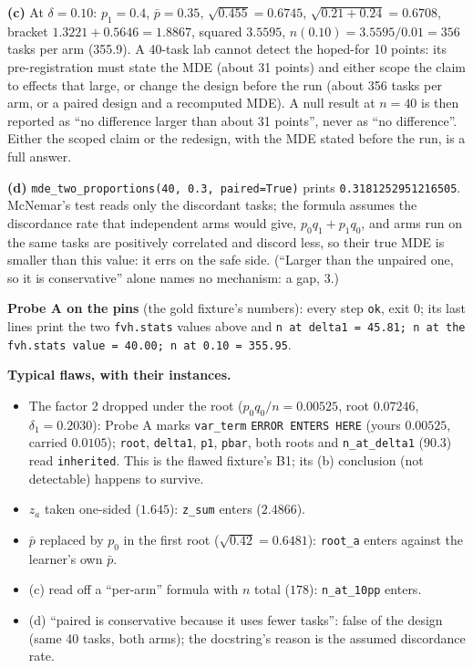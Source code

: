 \documentclass[11pt]{article}
\begin{document}
\textbf{(c)} At $\delta = 0.10$: $p_1 = 0.4$, $\bar p = 0.35$, $\sqrt{0.455} =
0.6745$, $\sqrt{0.21 + 0.24} = 0.6708$, bracket $1.3221 + 0.5646 = 1.8867$,
squared $3.5595$, $n(0.10) = 3.5595/0.01 = 356$ tasks per arm (355.9). A
40-task lab cannot detect the hoped-for 10 points: its pre-registration must
state the MDE (about 31 points) and either scope the claim to effects that
large, or change the design before the run (about 356 tasks per arm, or a
paired design and a recomputed MDE). A null result at $n = 40$ is then reported
as ``no difference larger than about 31 points'', never as ``no difference''.
Either the scoped claim or the redesign, with the MDE stated before the run, is
a full answer.

\textbf{(d)} \texttt{mde\_two\_proportions(40, 0.3, paired=True)} prints
\texttt{0.3181252951216505}. McNemar's test reads only the discordant tasks;
the formula assumes the discordance rate that independent arms would give,
$p_0 q_1 + p_1 q_0$, and arms run on the same tasks are positively correlated
and discord less, so their true MDE is smaller than this value: it errs on the
safe side. (``Larger than the unpaired one, so it is conservative'' alone names
no mechanism: a gap, 3.)

\textbf{Probe A on the pins} (the gold fixture's numbers): every step
\texttt{ok}, exit 0; its last lines print the two \texttt{fvh.stats} values above
and \texttt{n at delta1 = 45.81; n at the fvh.stats value = 40.00; n at 0.10 =
355.95}.

\textbf{Typical flaws, with their instances.}
\begin{itemize}
\item The factor 2 dropped under the root ($p_0 q_0 / n = 0.00525$, root
  $0.07246$, $\delta_1 = 0.2030$): Probe A marks \texttt{var\_term}
  \texttt{ERROR ENTERS HERE} (yours $0.00525$, carried $0.0105$); \texttt{root},
  \texttt{delta1}, \texttt{p1}, \texttt{pbar}, both roots and
  \texttt{n\_at\_delta1} ($90.3$) read \texttt{inherited}. This is the flawed
  fixture's B1; its (b) conclusion (not detectable) happens to survive.
\item $z_a$ taken one-sided ($1.645$): \texttt{z\_sum} enters ($2.4866$).
\item $\bar p$ replaced by $p_0$ in the first root ($\sqrt{0.42} = 0.6481$):
  \texttt{root\_a} enters against the learner's own $\bar p$.
\item (c) read off a ``per-arm'' formula with $n$ total ($178$): \texttt{n\_at\_10pp}
  enters.
\item (d) ``paired is conservative because it uses fewer tasks'': false of
  the design (same 40 tasks, both arms); the docstring's reason is the assumed
  discordance rate.
\end{itemize}
\end{document}
